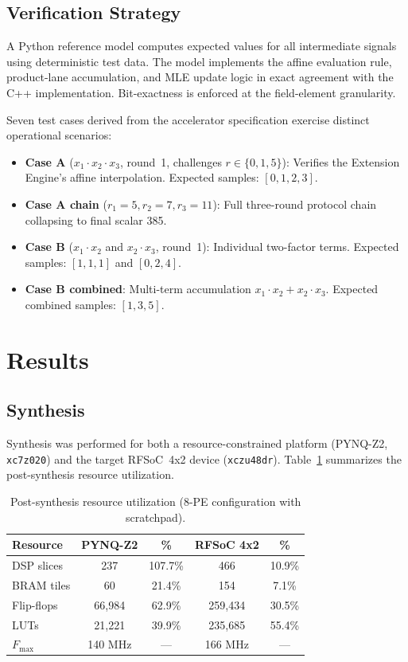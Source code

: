 \documentclass[conference]{IEEEtran}
\begin{document}
\subsection{Verification Strategy}

A Python reference model computes expected values for all intermediate signals using deterministic test data. The model implements the affine evaluation rule, product-lane accumulation, and MLE update logic in exact agreement with the C++ implementation. Bit-exactness is enforced at the field-element granularity.

Seven test cases derived from the accelerator specification exercise distinct operational scenarios:

\begin{itemize}
\item \textbf{Case A} ($x_1 \cdot x_2 \cdot x_3$, round~1, challenges $r \in \{0,1,5\}$): Verifies the Extension Engine's affine interpolation. Expected samples: $[0,1,2,3]$.
\item \textbf{Case A chain} ($r_1=5, r_2=7, r_3=11$): Full three-round protocol chain collapsing to final scalar 385.
\item \textbf{Case B} ($x_1 \cdot x_2$ and $x_2 \cdot x_3$, round~1): Individual two-factor terms. Expected samples: $[1,1,1]$ and $[0,2,4]$.
\item \textbf{Case B combined}: Multi-term accumulation $x_1 \cdot x_2 + x_2 \cdot x_3$. Expected combined samples: $[1,3,5]$.
\end{itemize}

\section{Results}

\subsection{Synthesis}

Synthesis was performed for both a resource-constrained platform (PYNQ-Z2, \texttt{xc7z020}) and the target RFSoC~4x2 device (\texttt{xczu48dr}). Table~\ref{tab:synthesis} summarizes the post-synthesis resource utilization.

\begin{table}[t]
\centering
\caption{Post-synthesis resource utilization (8-PE configuration with scratchpad).}
\label{tab:synthesis}
\begin{tabular}{@{}lcccc@{}}
\toprule
\textbf{Resource} & \textbf{PYNQ-Z2} & \textbf{\%} & \textbf{RFSoC 4x2} & \textbf{\%} \\
\midrule
DSP slices  & 237  & 107.7\% & 466   & 10.9\% \\
BRAM tiles  & 60   & 21.4\%  & 154   & 7.1\%  \\
Flip-flops  & 66,984 & 62.9\% & 259,434 & 30.5\% \\
LUTs        & 21,221 & 39.9\% & 235,685 & 55.4\% \\
$F_{\max}$ & 140 MHz & ---   & 166 MHz & --- \\
\bottomrule
\end{tabular}
\end{table}
\end{document}
